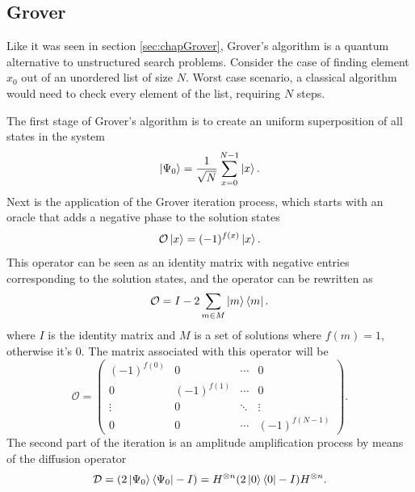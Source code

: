 \documentclass[../../dissertation.tex]{subfiles}
\begin{document}
\subsection{Grover}
Like it was seen in section \ref{sec:chapGrover}, Grover's algorithm is a quantum alternative to unstructured search problems. Consider the case of finding element $x_0$ out of an unordered list of size $N$. Worst case scenario, a classical algorithm would need to check every element of the list, requiring $N$ steps.\par
The first stage of Grover's algorithm is to create an uniform superposition of all states in the system
\begin{equation}
	\ket{\Psi_0}  = \frac{1}{\sqrt{N}}\sum_{x=0}^{N-1} \ket{x}.
\end{equation}
Next is the application of the Grover iteration process, which starts with an oracle that adds a negative phase to the solution states
\begin{equation}
        \mathcal{O}\ket{x} = (-1)^{f(x)}\ket{x}.
\end{equation}
This operator can be seen as an identity matrix with negative entries corresponding to the solution states, and the operator can be rewritten as 
\begin{equation}
	\mathcal{O} = I - 2\sum_{m\in M} \ket{m}\bra{m}.
	\label{eq:groverQiskitOracle}
\end{equation}
where $I$ is the identity matrix and $M$ is a set of solutions where $f(m) = 1$, otherwise it's $0$. The matrix associated with this operator will be
\begin{equation}
	\mathcal{O} = 
	\begin{pmatrix}
		(-1)^{f(0)} & 0 & \cdots & 0\\
	        0 & (-1)^{f(1)} & \cdots & 0\\ 
	        \vdots & 0 &  \ddots & \vdots\\ 
		0 & 0 & \cdots &  (-1)^{f(N-1)}
	\end{pmatrix}.
	\label{eq:oracleMatrixQiskit}
\end{equation}
The second part of the iteration is an amplitude amplification process by means of the diffusion operator 
\begin{equation}
        \mathcal{D} = (2\ket{\Psi_0}\bra{\Psi_0} - I) = H^{\otimes n}(2\ket{0}\bra{0} - I)H^{\otimes n}.
	\label{eq:groverQiskitDiffusion}
\end{equation}
\end{document}

